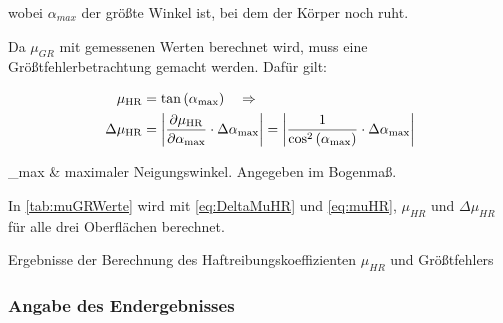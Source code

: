 wobei $\alpha_{max}$ der größte Winkel ist, bei dem der Körper noch ruht.\newline

Da $\mu_{GR}$ mit gemessenen Werten berechnet wird, muss eine Größtfehlerbetrachtung gemacht werden. Dafür gilt:


\begin{align}
\mu_{\mathrm{HR}} &=\tan \left(\alpha_{\max }\right) \quad \Rightarrow \nonumber \\
\Delta \mu_{\mathrm{HR}}&=\left|\frac{\partial \mu_{\mathrm{HR}}}{\partial \alpha_{\max }} \cdot \Delta \alpha_{\max }\right|=\abs*{\frac{1}{\cos ^{2}\left(\alpha_{\max }\right)} \cdot \Delta \alpha_{\max }} \label{eq:DeltaMuHR}
\end{align}
\begin{conditions}
\alpha_{max} & maximaler Neigungswinkel. Angegeben im Bogenmaß.
\end{conditions}

In \autoref{tab:muGRWerte} wird mit \autoref{eq:DeltaMuHR} und \autoref{eq:muHR}, $\mu_{HR}$ und $\Delta \mu_{HR}$ für alle drei Oberflächen berechnet.

\begin{table}[h]
  \center 
  \caption[Haftreibungskoeffizienten und Größtfehler]{Ergebnisse der Berechnung des Haftreibungskoeffizienten $\mu_{HR}$ und Größtfehlers}
  
  \label{tab:muGRWerte}
\end{table}

\subsubsection{Angabe des Endergebnisses}